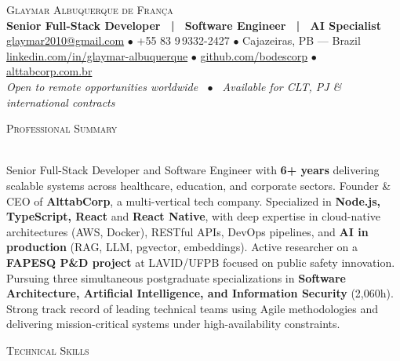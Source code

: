 \documentclass[a4paper]{article}
\newcommand{\lineunder}{
    \vspace*{-8pt} \\
    \hspace*{-18pt} \hrulefill \\
}
\newcommand{\header}[1]{
    {\hspace*{-18pt}\vspace*{6pt} \textsc{#1}}
    \vspace*{-6pt} \lineunder
}
\begin{document}
\vspace*{-40pt}

\begin{center}
    {\Huge \scshape {Glaymar Albuquerque de Fran\c{c}a}}\\
    \vspace*{4pt}
    {\large \textbf{Senior Full-Stack Developer \ | \ Software Engineer \ | \ AI Specialist}}\\
    \vspace*{4pt}
    \href{mailto:glaymar2010@gmail.com}{glaymar2010@gmail.com}
    $\bullet$ +55 83 9\,9332-2427
    $\bullet$ Cajazeiras, PB — Brazil\\
    \vspace*{2pt}
    \href{https://linkedin.com/in/glaymar-albuquerque-de-fran\%C3\%A7a}{linkedin.com/in/glaymar-albuquerque}
    $\bullet$ \href{https://github.com/bodescorp}{github.com/bodescorp}
    $\bullet$ \href{https://alttabcorp.com.br}{alttabcorp.com.br}\\
    \vspace*{3pt}
    \textit{Open to remote opportunities worldwide \ $\bullet$ \ Available for CLT, PJ \& international contracts}
\end{center}

\header{Professional Summary}
\vspace{2mm}

Senior Full-Stack Developer and Software Engineer with \textbf{6+ years} delivering scalable systems across healthcare, education, and corporate sectors. Founder \& CEO of \textbf{AlttabCorp}, a multi-vertical tech company. Specialized in \textbf{Node.js, TypeScript, React} and \textbf{React Native}, with deep expertise in cloud-native architectures (AWS, Docker), RESTful APIs, DevOps pipelines, and \textbf{AI in production} (RAG, LLM, pgvector, embeddings). Active researcher on a \textbf{FAPESQ P\&D project} at LAVID/UFPB focused on public safety innovation. Pursuing three simultaneous postgraduate specializations in \textbf{Software Architecture, Artificial Intelligence, and Information Security} (2,060h). Strong track record of leading technical teams using Agile methodologies and delivering mission-critical systems under high-availability constraints.

\vspace{3mm}

\header{Technical Skills}
\vspace{2mm}
\end{document}

